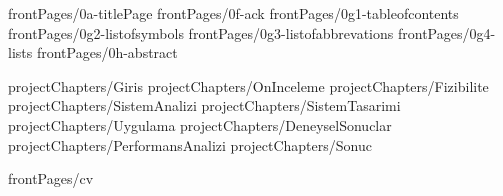 \documentclass[a4paper,12pt,oneside,openany]{book}
\begin{document}
\onehalfspacing
{}

 {frontPages/0a-titlePage}
 {frontPages/0f-ack}
 {frontPages/0g1-tableofcontents}
 {frontPages/0g2-listofsymbols}
 {frontPages/0g3-listofabbrevations}
 {frontPages/0g4-lists}
 {frontPages/0h-abstract}

\onehalfspacing
\clearpage
{}

 {projectChapters/Giris}
 {projectChapters/OnInceleme}
 {projectChapters/Fizibilite}
 {projectChapters/SistemAnalizi}
 {projectChapters/SistemTasarimi}
 {projectChapters/Uygulama}
 {projectChapters/DeneyselSonuclar}
 {projectChapters/PerformansAnalizi}
 {projectChapters/Sonuc}

\newpage\appendix


\newpage
{}
\singlespacing
\printbibliography[title={\bibName}]

\ifnum{}
\newpage
 {frontPages/cv}
\fi
\end{document}
